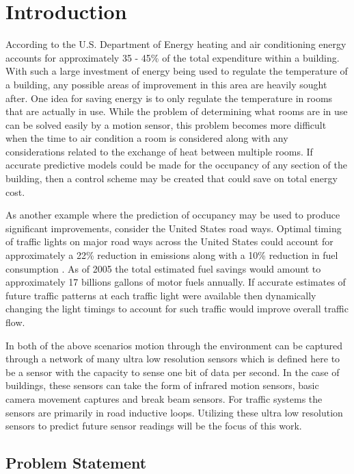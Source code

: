 \chapter{Introduction}
According to the U.S. Department of Energy \cite{DOE2010} heating and air conditioning energy accounts for approximately 35 - 45\% of the total expenditure within a building.  With such a large investment of energy being used to regulate the temperature of a building, any possible areas of improvement in this area are heavily sought after.  One idea for saving energy is to only regulate the temperature in rooms that are actually in use.  While the problem of determining what rooms are in use can be solved easily by a motion sensor, this problem becomes more difficult when the time to air condition a room is considered along with any considerations related to the exchange of heat between multiple rooms.  If accurate predictive models could be made for the occupancy of any section of the building, then a control scheme may be created that could save on total energy cost.

As another example where the prediction of occupancy may be used to produce significant improvements, consider the United States road ways.  Optimal timing of traffic lights on major road ways across the United States could account for approximately a 22\% reduction in emissions along with a 10\% reduction in fuel consumption \cite{DOT2007}.  As of 2005 the total estimated fuel savings would amount to approximately 17 billions gallons of motor fuels annually.  If accurate estimates of future traffic patterns at each traffic light were available then dynamically changing the light timings to account for such traffic would improve overall traffic flow.

In both of the above scenarios motion through the environment can be captured through a network of many ultra low resolution sensors \cite{Wren2006a} which is defined here to be a sensor with the capacity to sense one bit of data per second.  In the case of buildings, these sensors can take the form of infrared motion sensors, basic camera movement captures and break beam sensors.  For traffic systems the sensors are primarily in road inductive loops.  Utilizing these ultra low resolution sensors to predict future sensor readings will be the focus of this work.

\section{Problem Statement}


